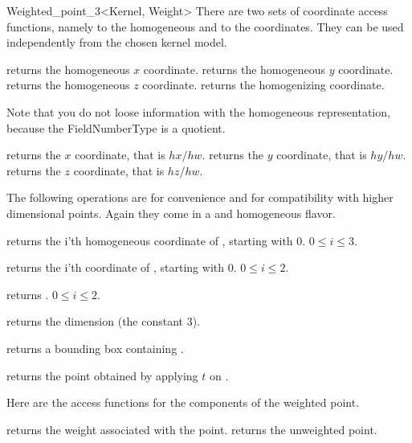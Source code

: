 \begin{ccRefClass} {Weighted_point_3<Kernel, Weight>}
There are two sets of coordinate access functions, namely to the
homogeneous and to the  coordinates. They can be used
independently from the chosen kernel model.

       {returns the homogeneous $x$ coordinate.}
\ccGlue
{}
       {returns the homogeneous $y$ coordinate.}
\ccGlue
{}
       {returns the homogeneous $z$ coordinate.}
\ccGlue
{}
       {returns the homogenizing  coordinate.}

Note that you do not loose information with the homogeneous
representation, because the FieldNumberType is a quotient.

       {returns the  $x$ coordinate, that is $hx/hw$.}
\ccGlue
{}
       {returns the  $y$ coordinate, that is $hy/hw$.}
\ccGlue
{}
       {returns the  $z$ coordinate, that is $hz/hw$.}
       
The following operations are for convenience and for compatibility
with higher dimensional points. Again they come in a
 and homogeneous flavor.

       {returns the i'th homogeneous coordinate of \ccVar, starting with 0.
        \ccPrecond $0\leq i \leq 3$.}

       {returns the i'th  coordinate of \ccVar, starting with 0.
        \ccPrecond $0\leq i \leq 2$.}

       {returns .
        \ccPrecond $0\leq i \leq 2$.}

       {returns the dimension (the constant 3).}

       {returns a bounding box containing \ccVar.}

       {returns the point obtained by applying $t$ on \ccVar.}

Here are the access functions for the components of the weighted point.

       {returns the weight associated with the point.}
\ccGlue
{}
       {returns the unweighted point.}


\end{ccRefClass}
